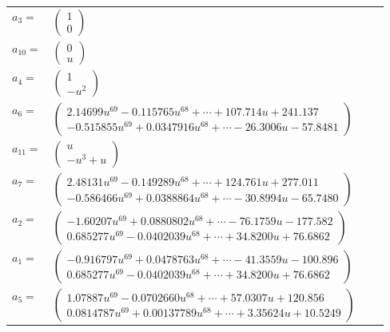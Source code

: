\documentclass[1p]{elsarticle_modified}
\theoremstyle{definition}
\begin{document}
\begin{tabular}{m{7pt} m{180pt} m{7pt} m{180pt} }
\flushright $a_{3}=$&$\begin{pmatrix}1\\0\end{pmatrix}$ \\
\flushright $a_{10}=$&$\begin{pmatrix}0\\u\end{pmatrix}$ \\
\flushright $a_{4}=$&$\begin{pmatrix}1\\- u^2\end{pmatrix}$ \\
\flushright $a_{6}=$&$\begin{pmatrix}2.14699 u^{69}-0.115765 u^{68}+\cdots+107.714 u+241.137\\-0.515855 u^{69}+0.0347916 u^{68}+\cdots-26.3006 u-57.8481\end{pmatrix}$ \\
\flushright $a_{11}=$&$\begin{pmatrix}u\\- u^3+u\end{pmatrix}$ \\
\flushright $a_{7}=$&$\begin{pmatrix}2.48131 u^{69}-0.149289 u^{68}+\cdots+124.761 u+277.011\\-0.586466 u^{69}+0.0388864 u^{68}+\cdots-30.8994 u-65.7480\end{pmatrix}$ \\
\flushright $a_{2}=$&$\begin{pmatrix}-1.60207 u^{69}+0.0880802 u^{68}+\cdots-76.1759 u-177.582\\0.685277 u^{69}-0.0402039 u^{68}+\cdots+34.8200 u+76.6862\end{pmatrix}$ \\
\flushright $a_{1}=$&$\begin{pmatrix}-0.916797 u^{69}+0.0478763 u^{68}+\cdots-41.3559 u-100.896\\0.685277 u^{69}-0.0402039 u^{68}+\cdots+34.8200 u+76.6862\end{pmatrix}$ \\
\flushright $a_{5}=$&$\begin{pmatrix}1.07887 u^{69}-0.0702660 u^{68}+\cdots+57.0307 u+120.856\\0.0814787 u^{69}+0.00137789 u^{68}+\cdots+3.35624 u+10.5249\end{pmatrix}$ \\

\end{tabular}
\end{document}

